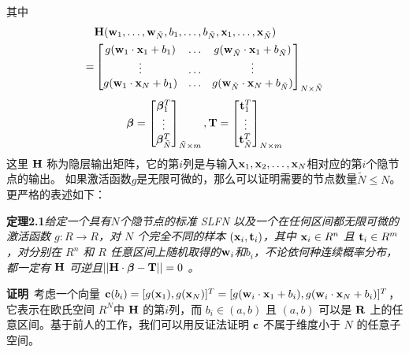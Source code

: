 \documentclass[conference]{IEEEtran}
\begin{document}
其中
\begin{equation}
	\begin{split}\label{eq4}
		& {\bf{H}}({\bf{w}}_1,\dots,{\bf{w}}_{\tilde{N}},b_1,\dots,b_{\tilde{N}},{\bf{x}}_1,\dots,{\bf{x}}_{\tilde{N}})\\
		= & \begin{bmatrix}
			g({{\bf{w}}_1}\cdot{{\bf{x}}_1}+b_1) & \dots & g({{\bf{w}}_{\tilde{N}}}\cdot{{\bf{x}}_1}+b_{\tilde{N}}) \\
			\vdots & \dots & \vdots \\
			g({{\bf{w}}_1}\cdot{{\bf{x}}_N}+b_1) & \dots & g({{\bf{w}}_{\tilde{N}}}\cdot{{\bf{x}}_N}+b_{\tilde{N}})
		\end{bmatrix}_{N\times{\tilde{N}}}
	\end{split}
\end{equation}
\begin{equation}\label{eq5}
	{\bm{\beta}}=
	\begin{bmatrix}
		{\bm{\beta}}_1^T\\
		\vdots \\
		{\bm{\beta}}_{\tilde{N}}^T
	\end{bmatrix}_{\tilde{N}\times m},
	{\bf{T}}=\begin{bmatrix}
		{\bf{t}}_1^T\\
		\vdots\\
		{\bf{t}}_{\tilde{N}}^T
	\end{bmatrix}_{N\times m}
\end{equation}
这里 ${\bf{H}}$ 称为隐层输出矩阵，它的第$i$列是与输入${\bf x}_1,{\bf x}_2,\dots,{\bf x}_N$相对应的第$i$个隐节点的输出。
如果激活函数$g$是无限可微的，那么可以证明需要的节点数量$\tilde{N}\le N$。更严格的表述如下：

\textbf{定理2.1}\textit{给定一个具有$N$个隐节点的标准 SLFN 以及一个在任何区间都无限可微的激活函数 $g: R\rightarrow R$，对 $N$ 个完全不同的样本 $({\bf x}_i,{\bf t}_i )$，其中 ${\bf x}_i\in R^n$ 且 ${\bf t}_i\in R^m$，对分别在 $R^n$ 和 $R$ 任意区间上随机取得的${\bf w}_i$和$b_i$，不论依何种连续概率分布，都一定有 ${\bf H}$ 可逆且${||\bf{H}}\cdot{\bm{\beta}}-{\bf{T}}||=0$ 。}

\textbf{证明}\ 考虑一个向量 ${\bf c}(b_i)=[g({\bf x}_1),g({\bf x}_N)]^T=[g({\bf w}_i\cdot{\bf x}_1+b_i),g({\bf w}_i\cdot{\bf x}_N+b_i)]^T$，它表示在欧氏空间 $R^N$中 ${\bf H}$ 的第$i$列，而 $b_i\in(a,b)$ 且 $(a,b)$ 可以是 ${\bf R}$ 上的任意区间。基于前人的工作，我们可以用反证法证明 ${\bf c}$ 不属于维度小于 $N$ 的任意子空间。
\end{document}
